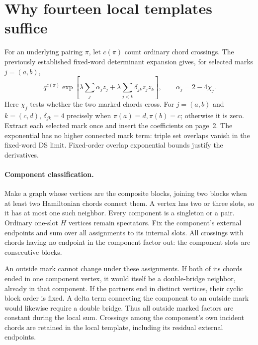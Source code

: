 \documentclass[11pt,a4paper]{article}
\begin{document}
\newpage
\section{Why fourteen local templates suffice}
For an underlying pairing $\pi$, let $c(\pi)$ count ordinary chord
crossings. The previously established fixed-word determinant expansion
\cite{local} gives, for selected marks $j=(a,b)$,
\begin{equation}
 q^{c(\pi)}\exp\!\left[\lambda\sum_j\alpha_j z_j+
                 \lambda\sum_{j<k}\delta_{jk}z_jz_k\right],\qquad
 \alpha_j=2-4\chi_j.\label{marks}
\end{equation}
Here $\chi_j$ tests whether the two marked chords cross. For
$j=(a,b)$ and $k=(c,d)$, $\delta_{jk}=4$ precisely when
$\pi(a)=d,\pi(b)=c$; otherwise it is zero. Extract each selected mark
once and insert the coefficients on page~2. The exponential has no
higher connected mark term: triple set overlaps vanish in the fixed-word
DS limit. Fixed-order overlap exponential bounds justify the derivatives.

\paragraph{Component classification.}
Make a graph whose vertices are the composite blocks, joining two blocks
when at least two Hamiltonian chords connect them. A vertex has two or
three slots, so it has at most one such neighbor. Every component is a
singleton or a pair. Ordinary one-slot $H$ vertices remain spectators.
Fix the component's external endpoints and sum over all assignments to
its internal slots. All crossings with chords having no endpoint in the
component factor out: the component slots are consecutive blocks.

An outside mark cannot change under these assignments. If both of its
chords ended in one component vertex, it would itself be a double-bridge
neighbor, already in that component. If the partners end in distinct
vertices, their cyclic block order is fixed. A delta term connecting the
component to an outside mark would likewise require a double bridge.
Thus all outside marked factors are constant during the local sum.
Crossings among the component's own incident chords are retained in the
local template, including its residual external endpoints.
\end{document}
